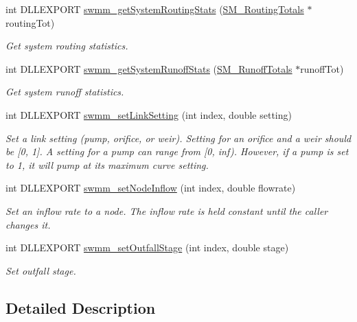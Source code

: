 \begin{DoxyCompactItemize}
int D\+L\+L\+E\+X\+P\+O\+RT \mbox{\hyperlink{group__tkfuncs_ga8e4dcd4d9243ac428633e7cdabf0712a}{swmm\+\_\+get\+System\+Routing\+Stats}} (\mbox{\hyperlink{struct_s_m___routing_totals}{S\+M\+\_\+\+Routing\+Totals}} $\ast$routing\+Tot)
\begin{DoxyCompactList}\small\item\em Get system routing statistics. \end{DoxyCompactList}\item 
int D\+L\+L\+E\+X\+P\+O\+RT \mbox{\hyperlink{group__tkfuncs_gabf3ea290e2af763289e18db435ea2ccd}{swmm\+\_\+get\+System\+Runoff\+Stats}} (\mbox{\hyperlink{struct_s_m___runoff_totals}{S\+M\+\_\+\+Runoff\+Totals}} $\ast$runoff\+Tot)
\begin{DoxyCompactList}\small\item\em Get system runoff statistics. \end{DoxyCompactList}\item 
int D\+L\+L\+E\+X\+P\+O\+RT \mbox{\hyperlink{group__tkfuncs_gab44d2b1c21a6f750b0ce4c48ba16be81}{swmm\+\_\+set\+Link\+Setting}} (int index, double setting)
\begin{DoxyCompactList}\small\item\em Set a link setting (pump, orifice, or weir). Setting for an orifice and a weir should be \mbox{[}0, 1\mbox{]}. A setting for a pump can range from \mbox{[}0, inf). However, if a pump is set to 1, it will pump at its maximum curve setting. \end{DoxyCompactList}\item 
int D\+L\+L\+E\+X\+P\+O\+RT \mbox{\hyperlink{group__tkfuncs_ga6438a8a45d7712b8b02ba630cd8e1db3}{swmm\+\_\+set\+Node\+Inflow}} (int index, double flowrate)
\begin{DoxyCompactList}\small\item\em Set an inflow rate to a node. The inflow rate is held constant until the caller changes it. \end{DoxyCompactList}\item 
int D\+L\+L\+E\+X\+P\+O\+RT \mbox{\hyperlink{group__tkfuncs_ga80d902400625073d8ff2c392365fde9b}{swmm\+\_\+set\+Outfall\+Stage}} (int index, double stage)
\begin{DoxyCompactList}\small\item\em Set outfall stage. \end{DoxyCompactList}\end{DoxyCompactItemize}


\subsection{Detailed Description}


